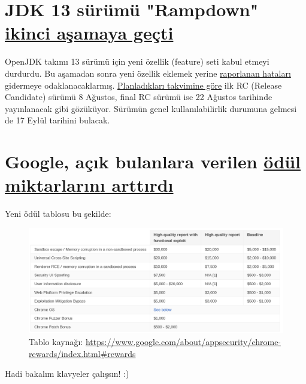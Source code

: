 \documentclass[11pt]{article}
\begin{document}
\section{JDK 13 sürümü "Rampdown" \href{https://mail.openjdk.java.net/pipermail/jdk-dev/2019-July/003170.html}{ikinci aşamaya geçti}}
\label{sec:orgc502bd4}
OpenJDK takımı 13 sürümü için yeni özellik (feature) seti kabul etmeyi
durdurdu. Bu aşamadan sonra yeni özellik eklemek yerine \href{https://bugs.openjdk.java.net/browse/JDK-8226964?filter=33405}{raporlanan hataları}
gidermeye odaklanacaklarmış. \href{http://openjdk.java.net/projects/jdk/13/\#Schedule}{Planladıkları takvimine göre} ilk RC (Release
Candidate) sürümü 8 Ağustos, final RC sürümü ise 22 Ağustos tarihinde
yayınlanacak gibi gözüküyor. Sürümün genel kullanılabilirlik durumuna gelmesi
de 17 Eylül tarihini bulacak.
\newpage
\section{Google, açık bulanlara verilen \href{https://security.googleblog.com/2019/07/bigger-rewards-for-security-bugs.html}{ödül miktarlarını arttırdı}}
\label{sec:org93f2c6e}
Yeni ödül tablosu bu şekilde:

\begin{figure}[htbp]
\centering
\includegraphics[width=.9\linewidth]{gorseller/google-odulleri-arttirdi.png}
\caption[//www.google.com/about/appsecurity/chrome-rewards/index.html\#rewards]{Tablo kaynağı: \url{https://www.google.com/about/appsecurity/chrome-rewards/index.html\#rewards}}
\end{figure}

Hadi bakalım klavyeler çalışsın! :)
\end{document}
